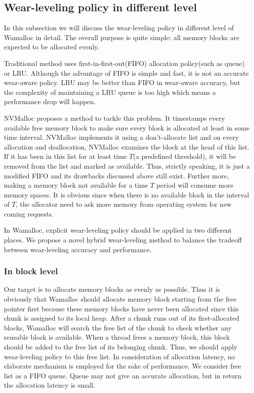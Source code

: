 \documentclass{vldb}
\begin{document}
\subsection{Wear-leveling policy in different level}

In this subsection we will discuss the wear-leveling policy in different level of Wamalloc in detail.
The overall purpose is quite simple: all memory blocks are expected to be allocated evenly.

Traditional method uses first-in-first-out(FIFO) allocation policy(such as queue) or LRU\cite{zhou2009durable}\cite{rodriguez2015write}.
Although the advantage of FIFO is simple and fast, it is not an accurate wear-aware policy.
LRU may be better than FIFO in wear-aware accuracy, but the complexity of maintaining a LRU queue is too high which means a performance drop will happen.

NVMalloc\cite{moraru2013consistent} proposes a method to tackle this problem.
It timestamps every available free memory block to make sure every block is allocated at least in some time interval.
NVMalloc implements it using a don't-allocate list and on every allocation and deallocation,
NVMalloc examines the block at the head of this list.
If it has been in this list for at least time $T$(a predefined threshold), it will be removed from the list and marked as available.
Thus, strictly speaking, it is just a modified FIFO and its drawbacks discussed above still exist.
Further more, making a memory block not available for a time $T$ period will consume more memory spaces. 
It is obvious since when there is no available block in the interval of $T$, the allocator need to ask more memory from operating system for new coming requests.

In Wamalloc, explicit wear-leveling policy should be applied in two different places. 
We propose a novel hybrid wear-leveling method to balance the tradeoff between wear-leveling accuracy and performance.

\subsubsection{In block level}
Our target is to allocate memory blocks as evenly as possible.
Thus it is obviously that Wamalloc should allocate memory block starting from the free pointer first
because these memory blocks have never been allocated since this chunk is assigned to its local heap.
After a chunk runs out of its first-allocated blocks, Wamalloc will search the free list of the chunk to check whether any reusable block is available.
When a thread frees a memory block, this block should be added to the free list of its belonging chunk.
Thus, we should apply wear-leveling policy to this free list.
In consideration of allocation latency, no elaborate mechanism is employed for the sake of performance.
We consider free list as a FIFO queue. Queue may not give an accurate allocation, but in return the allocation latency is small.
\end{document}
